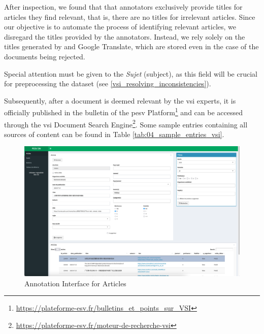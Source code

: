 After inspection, we found that that annotators exclusively provide titles for articles they find relevant, that is, there are no titles for irrelevant articles. Since our objective is to automate the process of identifying relevant articles, we disregard the titles provided by the annotators. Instead, we rely solely on the titles generated by \trafilatura{} and Google Translate, which are stored even in the case of the documents being rejected.

Special attention must be given to the \emph{Sujet} (subject), as this field will be crucial for preprocessing the dataset (see \headerName{} \ref{vsi_resolving_inconsistencies}).


Subsequently, after a document is deemed relevant by the \gls{vsi} experts, it is officially published in the bulletin of the  \gls{pesv} Platform\footnote{\url{https://plateforme-esv.fr/bulletins_et_points_sur_VSI}} and can be accessed through the \gls{vsi} Document Search Engine\footnote{\url{https://plateforme-esv.fr/moteur-de-recherche-vsi}}. Some sample entries containing all sources of content can be found in Table \ref{tab:04_sample_entries_vsi}.





\begin{landscape}
    \begin{figure}[ht]
        \centering
        \includegraphics[width=1.20\textwidth]{Figures/04/PESV_interface_1.png}
        \caption{\VSI{} Annotation Interface for Articles}
        \label{fig:04_pesv_interface_1}
    \end{figure}
\end{landscape}


